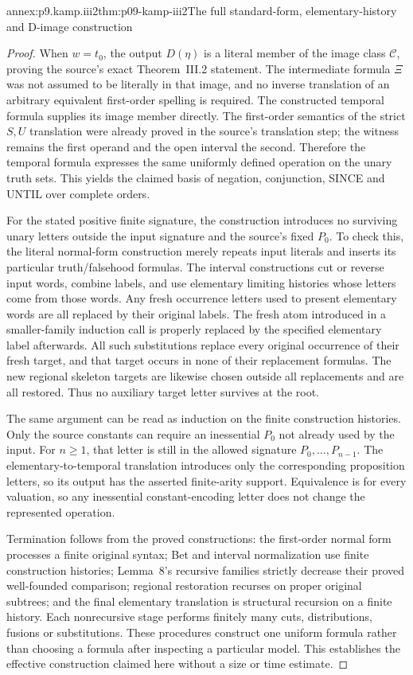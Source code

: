 \begin{annexitem}{annex:p9.kamp.iii2}{thm:p09-kamp-iii2}{The full standard-form, elementary-history and D-image construction}
\begin{proof}
When \(w=t_0\), the output \(D(\eta)\) is a literal
member of the image class \(\mathcal C\), proving the source's
exact Theorem~III.2 statement. The intermediate formula \(\Xi\)
was not assumed to be literally in that image, and no inverse
translation of an arbitrary equivalent first-order spelling is
required. The constructed temporal formula supplies its image member
directly. The first-order semantics of the strict \(S,U\)
translation were already proved in the source's translation step;
the witness remains the first operand and the open interval the
second. Therefore the temporal formula expresses the same uniformly
defined operation on the unary truth sets. This yields the claimed
basis of negation, conjunction, SINCE and UNTIL over complete orders.

For the stated positive finite signature, the construction introduces
no surviving unary letters outside the input signature and the
source's fixed \(P_0\). To check this, the literal normal-form
construction merely repeats input literals and inserts its particular
truth/falsehood formulas. The interval constructions cut or reverse
input words, combine labels, and use elementary limiting histories
whose letters come from those words. Any fresh occurrence letters
used to present elementary words are all replaced by their original
labels. The fresh atom introduced in a smaller-family induction call
is properly replaced by the specified elementary label afterwards.
All such substitutions replace every original occurrence of their
fresh target, and that target occurs in none of their replacement
formulas. The new regional skeleton targets are likewise chosen
outside all replacements and are all restored. Thus no auxiliary
target letter survives at the root.

The same argument can be read as induction on the finite construction
histories. Only the source constants can require an inessential
\(P_0\) not already used by the input. For \(n\geq1\),
that letter is still in the allowed signature
\(P_0,\ldots,P_{n-1}\). The elementary-to-temporal translation
introduces only the corresponding proposition letters, so its output
has the asserted finite-arity support. Equivalence is for every
valuation, so any inessential constant-encoding letter does not
change the represented operation.

Termination follows from the proved constructions: the first-order
normal form processes a finite original syntax; Bet and interval
normalization use finite construction histories; Lemma~8's recursive
families strictly decrease their proved well-founded comparison;
regional restoration recurses on proper original subtrees; and
the final elementary translation is structural recursion on a finite
history. Each nonrecursive stage performs finitely many cuts,
distributions, fusions or substitutions. These procedures construct
one uniform formula rather than choosing a formula after inspecting
a particular model. This establishes the effective construction
claimed here without a size or time estimate.


\end{proof}
\end{annexitem}
